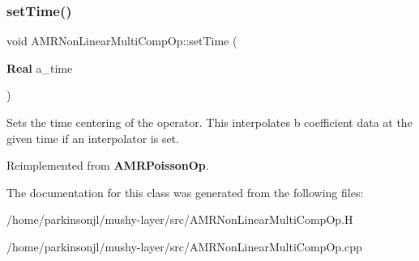 \subsubsection{\texorpdfstring{set\+Time()}{setTime()}}
{\footnotesize\ttfamily void A\+M\+R\+Non\+Linear\+Multi\+Comp\+Op\+::set\+Time (\begin{DoxyParamCaption}\item[{\textbf{ Real}}]{a\+\_\+time }\end{DoxyParamCaption})\hspace{0.3cm}{\ttfamily [virtual]}}

Sets the time centering of the operator. This interpolates b coefficient data at the given time if an interpolator is set. 

Reimplemented from \textbf{ A\+M\+R\+Poisson\+Op}.



The documentation for this class was generated from the following files\+:\begin{DoxyCompactItemize}
\item 
/home/parkinsonjl/mushy-\/layer/src/A\+M\+R\+Non\+Linear\+Multi\+Comp\+Op.\+H\item 
/home/parkinsonjl/mushy-\/layer/src/A\+M\+R\+Non\+Linear\+Multi\+Comp\+Op.\+cpp\end{DoxyCompactItemize}
